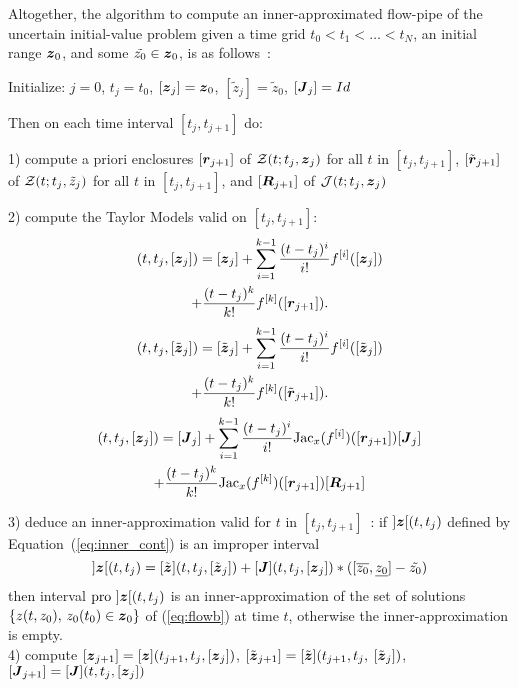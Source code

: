 \documentclass{sig-alternate-05-2015} %
\newcommand{\pro}{\mbox{pro }}
\begin{document}
Altogether, the algorithm to compute an inner-approximated flow-pipe of the uncertain initial-value problem given a time grid  $t_0 < t_1 < \ldots < t_N$, 
an initial range $\z_0$, and some $\tilde{z_0} \in \z_0$, is as follows~:
 {\par\smallskip                     %
  \begin{center}%
   \fbox%
   {\parbox{1.\linewidth}%
    { %
Initialize: $j=0$, $t_j=t_0$, $[\z_j]=\z_0$, $[\tilde{z}_j]=\tilde{z}_0$, $[\J_j] = Id$

Then on each time interval $[t_j,t_{j+1}]$ do:

1) compute a priori enclosures $[\r_{j+1}]$  of  ${\cal Z}(t;t_j,\z_j)$ for all $t$ in $[t_j,t_{j+1}]$, $[\tilde{\r}_{j+1}]$  of  ${\cal Z}(t;t_j,\tilde{z}_j)$ for all $t$ in $[t_j,t_{j+1}]$,
and $[\bfm{R}_{j+1}]$ of ${\cal J}(t;t_j,\z_j)$

2) compute the Taylor Models valid on $[t_j,t_{j+1}]$:
\begin{multline}
[\z](t,t_j,[{\z}_j]) = [{\z}_j] + \sum\limits_{i=1}^{k-1} \frac{(t-t_j)^i}{i !} f^{[i]}([{\z}_j])\\+ 
\frac{(t-t_j)^k}{k !} f^{[k]}([{\r}_{j+1}]).
\label{eq:TM1}
\end{multline}
\begin{multline}
[\tilde{\z}](t,t_j,[\tilde{\z}_j]) = [\tilde{\z}_j] + \sum\limits_{i=1}^{k-1} \frac{(t-t_j)^i}{i !} f^{[i]}([\tilde{\z}_j])\\+ \frac{(t-t_j)^k}{k !} f^{[k]}([\tilde{\r}_{j+1}]).
\label{eq:TM2}
\end{multline}
\begin{multline}
[\J](t,t_j,[{\z}_j]) = [{\J}_j] + \sum\limits_{i=1}^{k-1} \frac{(t-t_j)^i}{i !} \mbox{Jac}_x(f^{[i]})([{\r}_{j+1}]) [{\J}_j] \\ +  \frac{(t-t_j)^k}{k !} \mbox{Jac}_x(f^{[k]})([{\r}_{j+1}]) [\bfm{R}_{j+1}]
\label{eq:TM3}
\end{multline}

3) deduce an inner-approximation valid for $t$ in $[t_j,t_{j+1}]$~: if $]\z[(t,t_j)$ defined by Equation~(\ref{eq:inner_cont}) is an improper interval\\
\begin{equation} 
]\z[(t,t_j) = [\tilde{\z}](t,t_j,[\tilde{\z}_j]) + [\J](t,t_j,[{\z}_j])*([\overline{z_0},\underline{z_0}]-\tilde{z_0}) 
\label{eq:inner_cont}
\end{equation}
\noindent 
then interval $\pro]\z[(t,t_j)$ is an inner-approximation of  the set of solutions $\{ z(t,z_0), \, z_0(t_0) \in \z_0 \}$ of  (\ref{eq:flowb}) at time $t$,
otherwise the inner-approximation is empty.\\

4) compute $[{\z}_{j+1}]=[\z](t_{j+1},t_j,[{\z}_j])$, $[\tilde{\z}_{j+1}]=[\tilde{\z}](t_{j+1},t_j,$ $[\tilde{\z}_j])$, $[\J_{j+1}] = [\J](t,t_j,[{\z}_j]) $\\
 }%
   }%
  \end{center}%
  \par\smallskip                     %
 }        
\end{document}
